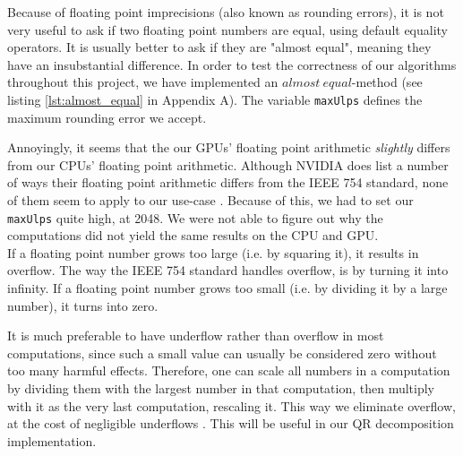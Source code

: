 Because of floating point imprecisions (also known as rounding errors), it is not very useful to ask if two floating point numbers are equal, using default equality operators. It is usually better to ask if they are "almost equal", meaning they have an insubstantial difference. In order to test the correctness of our algorithms throughout this project, we have implemented an $almost\ equal$-method (see listing \ref{lst:almost_equal} in Appendix A). The variable \texttt{maxUlps} defines the maximum rounding error we accept.

Annoyingly, it seems that the our GPUs' floating point arithmetic \textit{slightly} differs from our CPUs' floating point arithmetic. Although NVIDIA does list a number of ways their floating point arithmetic differs from the IEEE 754 standard, none of them seem to apply to our use-case \cite[Sect. 13.1]{nvidia:cudadoc}. Because of this, we had to set our \texttt{maxUlps} quite high, at 2048. We were not able to figure out why the computations did not yield the same results on the CPU and GPU.\\

\noindent If a floating point number grows too large (i.e. by squaring it), it results in overflow. The way the IEEE 754 standard handles overflow, is by turning it into infinity. If a floating point number grows too small (i.e. by dividing it by a large number), it turns into zero. 

It is much preferable to have underflow rather than overflow in most computations, since such a small value can usually be considered zero without too many harmful effects. Therefore, one can scale all numbers in a computation by dividing them with the largest number in that computation, then multiply with it as the very last computation, rescaling it. This way we eliminate overflow, at the cost of negligible underflows \cite{afternotes}. This will be useful in our QR decomposition implementation.


